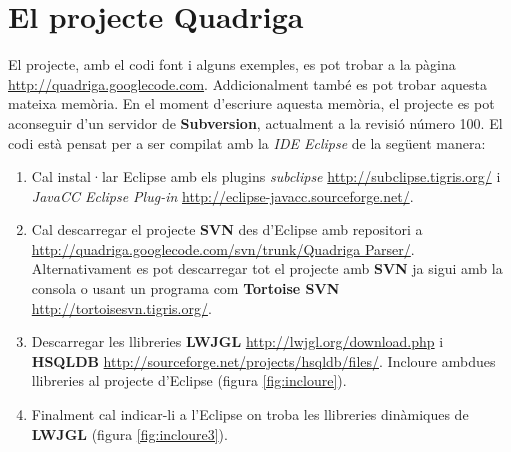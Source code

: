 \chapter{El projecte Quadriga}

El projecte, amb el codi font i alguns exemples, es pot trobar a la pàgina \url{http://quadriga.googlecode.com}. Addicionalment també es pot trobar aquesta mateixa memòria. En el moment d'escriure aquesta memòria, el projecte es pot aconseguir d'un servidor de {\bf Subversion}, actualment a la revisió número 100. El codi està pensat per a ser compilat amb la {\em IDE Eclipse} de la següent manera:

\begin{enumerate}
  \item Cal instal·lar Eclipse amb els plugins {\em subclipse} \url{http://subclipse.tigris.org/} i {\em JavaCC Eclipse Plug-in} \url{http://eclipse-javacc.sourceforge.net/}.
  
  \item Cal descarregar el projecte {\bf SVN} des d'Eclipse amb repositori a \url{http://quadriga.googlecode.com/svn/trunk/Quadriga Parser/}. \\
        Alternativament es pot descarregar tot el projecte amb {\bf SVN} ja sigui amb la consola o usant un programa com {\bf Tortoise SVN} \url{http://tortoisesvn.tigris.org/}.
        
  \item Descarregar les llibreries {\bf LWJGL} \url{http://lwjgl.org/download.php} i {\bf HSQLDB} \url{http://sourceforge.net/projects/hsqldb/files/}. 
        Incloure ambdues llibreries al projecte d'Eclipse (figura \ref{fig:incloure}).
        
  \item Finalment cal indicar-li a l'Eclipse on troba les llibreries dinàmiques de {\bf LWJGL} (figura \ref{fig:incloure3}).
\end{enumerate}

